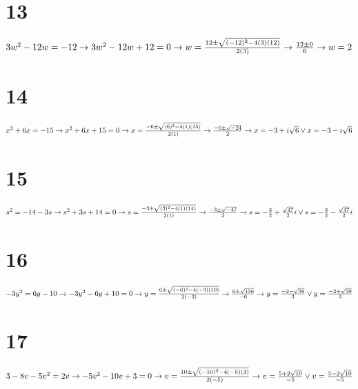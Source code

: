 \documentclass{article}
\theoremstyle{definition}
\begin{document}
\section*{13}
$3w^2-12w=-12\newline\rightarrow 3w^2-12w+12=0\newline\rightarrow w=\frac{12\pm\sqrt{(-12)^2-4(3)(12)}}{2(3)}\newline\rightarrow \frac{12\pm 0}{6}
\newline\rightarrow w=2$

\section*{14}
$x^2+6x=-15\newline\rightarrow x^2+6x+15=0\newline\rightarrow x=\frac{-6\pm\sqrt{(6)^2-4(1)(15)}}{2(1)}\newline\rightarrow \frac{-6\pm \sqrt{-24}}{2}
\newline\rightarrow x=-3+i\sqrt{6}\vee x=-3-i\sqrt{6}$

\section*{15}
$s^2=-14-3s\newline\rightarrow s^2+3s+14=0\newline\rightarrow s=\frac{-3\pm\sqrt{(3)^2-4(1)(14)}}{2(1)}\newline\rightarrow \frac{-3\pm\sqrt{-47}}{2}\newline
\rightarrow s=-\frac{3}{2}+\frac{\sqrt{47}}{2}i \vee s=-\frac{3}{2}-\frac{\sqrt{47}}{2}i$

\section*{16}
$-3y^2=6y-10\newline\rightarrow -3y^2-6y+10=0\newline\rightarrow y=\frac{6\pm\sqrt{(-6)^2-4(-3)(10)}}{2(-3)}\newline\rightarrow \frac{6\pm\sqrt{156}}{-6}
\newline\rightarrow y=\frac{-2-\sqrt{39}}{3}\vee y=\frac{-2+\sqrt{39}}{3}$

\section*{17}
$3-8v-5v^2=2v\newline\rightarrow -5v^2-10v+3=0\newline\rightarrow v=\frac{10\pm\sqrt{(-10)^2-4(-5)(3)}}{2(-5)}\newline\rightarrow 
v=\frac{5+2\sqrt{10}}{-5}\vee v=\frac{5-2\sqrt{10}}{-5}$
\end{document}
